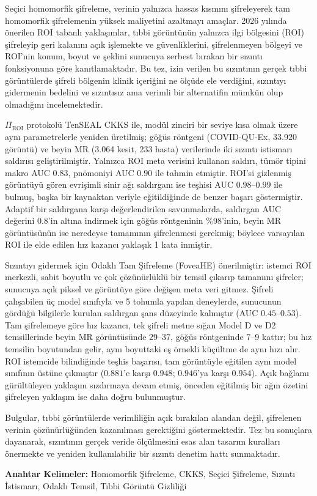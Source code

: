 Seçici homomorfik şifreleme, verinin yalnızca hassas kısmını şifreleyerek tam homomorfik şifrelemenin yüksek maliyetini azaltmayı amaçlar. 2026 yılında önerilen ROI tabanlı yaklaşımlar, tıbbi görüntünün yalnızca ilgi bölgesini (ROI) şifreleyip geri kalanını açık işlemekte ve güvenliklerini, şifrelenmeyen bölgeyi ve ROI'nin konum, boyut ve şeklini sunucuya serbest bırakan bir sızıntı fonksiyonuna göre kanıtlamaktadır. Bu tez, izin verilen bu sızıntının gerçek tıbbi görüntülerde şifreli bölgenin klinik içeriğini ne ölçüde ele verdiğini, sızıntıyı gidermenin bedelini ve sızıntısız ama verimli bir alternatifin mümkün olup olmadığını incelemektedir.

$\Pi_{\mathrm{ROI}}$ protokolü TenSEAL CKKS ile, modül zinciri bir seviye kısa olmak üzere aynı parametrelerle yeniden üretilmiş; göğüs röntgeni (COVID-QU-Ex, 33.920 görüntü) ve beyin MR (3.064 kesit, 233 hasta) verilerinde iki sızıntı istismarı saldırısı geliştirilmiştir. Yalnızca ROI meta verisini kullanan saldırı, tümör tipini makro AUC $0.83$, pnömoniyi AUC $0.90$ ile tahmin etmiştir. ROI'si gizlenmiş görüntüyü gören evrişimli sinir ağı saldırganı ise teşhisi AUC $0.98$--$0.99$ ile bulmuş, başka bir kaynaktan veriyle eğitildiğinde de benzer başarı göstermiştir. Adaptif bir saldırgana karşı değerlendirilen savunmalarda, saldırgan AUC değerini $0.8$'in altına indirmek için göğüs röntgeninin \%98'inin, beyin MR görüntüsünün ise neredeyse tamamının şifrelenmesi gerekmiş; böylece varsayılan ROI ile elde edilen hız kazancı yaklaşık 1 kata inmiştir.

Sızıntıyı gidermek için Odaklı Tam Şifreleme (FoveaHE) önerilmiştir: istemci ROI merkezli, sabit boyutlu ve çok çözünürlüklü bir temsil çıkarıp tamamını şifreler; sunucuya açık piksel ve görüntüye göre değişen meta veri gitmez. Şifreli çalışabilen üç model sınıfıyla ve 5 tohumla yapılan deneylerde, sunucunun gördüğü bilgilerle kurulan saldırgan şans düzeyinde kalmıştır (AUC $0.45$--$0.53$). Tam şifrelemeye göre hız kazancı, tek şifreli metne sığan Model D ve D2 temsillerinde beyin MR görüntüsünde 29--37, göğüs röntgeninde 7--9 kattır; bu hız temsilin boyutundan gelir, aynı boyuttaki eş örnekli küçültme de aynı hızı alır. ROI istemcide bilindiğinde teşhis başarısı, tam görüntüyle eğitilen aynı model sınıfının üstüne çıkmıştır ($0.881$'e karşı $0.948$; $0.946$'ya karşı $0.954$). Açık bağlamı gürültüleyen yaklaşım sızdırmaya devam etmiş, önceden eğitilmiş bir ağın özetini şifreleyen yaklaşım ise daha doğru bulunmuştur.

Bulgular, tıbbi görüntülerde verimliliğin açık bırakılan alandan değil, şifrelenen verinin çözünürlüğünden kazanılması gerektiğini göstermektedir. Tez bu sonuçlara dayanarak, sızıntının gerçek veride ölçülmesini esas alan tasarım kuralları önermekte ve yeniden kullanılabilir bir sızıntı denetim hattı sunmaktadır.

\textbf{Anahtar Kelimeler:} Homomorfik Şifreleme, CKKS, Seçici Şifreleme, Sızıntı İstismarı, Odaklı Temsil, Tıbbi Görüntü Gizliliği
